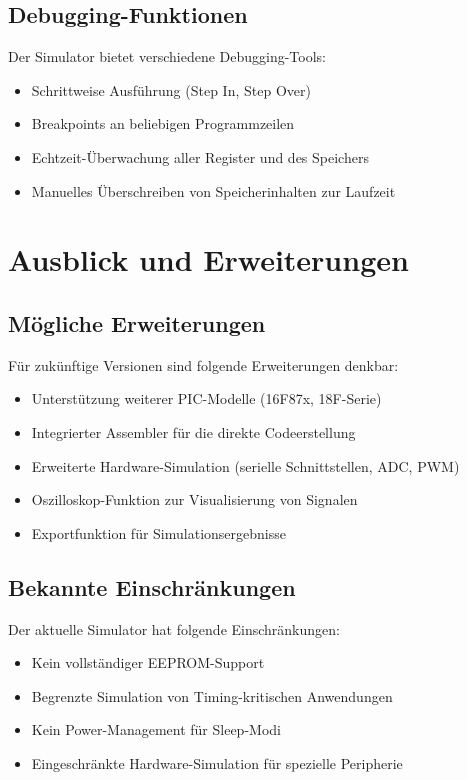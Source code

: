 \documentclass[a4paper,11pt]{report}
\begin{document}
\section{Debugging-Funktionen}
Der Simulator bietet verschiedene Debugging-Tools:

\begin{itemize}
    \item Schrittweise Ausführung (Step In, Step Over)
    \item Breakpoints an beliebigen Programmzeilen
    \item Echtzeit-Überwachung aller Register und des Speichers
    \item Manuelles Überschreiben von Speicherinhalten zur Laufzeit
\end{itemize}

\chapter{Ausblick und Erweiterungen}

\section{Mögliche Erweiterungen}
Für zukünftige Versionen sind folgende Erweiterungen denkbar:

\begin{itemize}
    \item Unterstützung weiterer PIC-Modelle (16F87x, 18F-Serie)
    \item Integrierter Assembler für die direkte Codeerstellung
    \item Erweiterte Hardware-Simulation (serielle Schnittstellen, ADC, PWM)
    \item Oszilloskop-Funktion zur Visualisierung von Signalen
    \item Exportfunktion für Simulationsergebnisse
\end{itemize}

\section{Bekannte Einschränkungen}
Der aktuelle Simulator hat folgende Einschränkungen:

\begin{itemize}
    \item Kein vollständiger EEPROM-Support
    \item Begrenzte Simulation von Timing-kritischen Anwendungen
    \item Kein Power-Management für Sleep-Modi
    \item Eingeschränkte Hardware-Simulation für spezielle Peripherie
\end{itemize}
\end{document}
